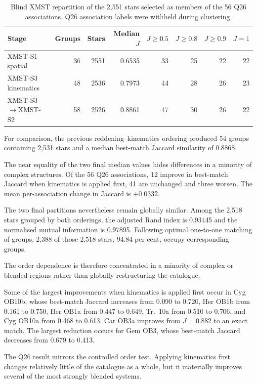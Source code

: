 \documentclass[fleqn,usenatbib]{rasti}
\begin{document}
\begin{table}
\centering
\caption{Blind XMST repartition of the 2,551 stars selected as members
of the 56 Q26 associations. Q26 association labels were withheld during
clustering.}
\label{tab:q26_order}
\begin{tabular}{lrrrrrrr}
\hline
Stage & Groups & Stars & Median $J$ &
$J\geq0.5$ & $J\geq0.8$ & $J\geq0.9$ & $J=1$ \\
\hline
XMST-S1 spatial
& 36 & 2551 & 0.6535 & 33 & 25 & 22 & 22 \\
XMST-S3 kinematics
& 48 & 2536 & 0.7973 & 44 & 28 & 26 & 23 \\
XMST-S3$\rightarrow$XMST-S2
& 58 & 2526 & 0.8861 & 47 & 30 & 26 & 22 \\
\hline
\end{tabular}
\end{table}

For comparison, the previous reddening--kinematics ordering produced
54 groups containing 2,531 stars and a median best-match Jaccard similarity
of 0.8868.

The near equality of the two final median values hides differences in a
minority of complex structures. Of the 56 Q26 associations, 12 improve in
best-match Jaccard when kinematics is applied first, 41 are unchanged and
three worsen. The mean per-association change in Jaccard is $+0.0332$.

The two final partitions nevertheless remain globally similar. Among the
2,518 stars grouped by both orderings, the adjusted Rand index is 0.93445
and the normalised mutual information is 0.97895. Following optimal
one-to-one matching of groups, 2,388 of those 2,518 stars, 94.84 per cent,
occupy corresponding groups.

The order dependence is therefore concentrated in a minority of complex or
blended regions rather than globally restructuring the catalogue.

Some of the largest improvements when kinematics is applied first occur in
Cyg OB10b, whose best-match Jaccard increases from 0.090 to 0.720,
Her OB1b from 0.161 to 0.750, Her OB1a from 0.447 to 0.649,
Tr.~10a from 0.510 to 0.706, and Cyg OB10a from 0.468 to 0.613.
Car OB3a improves from $J=0.882$ to an exact match. The largest reduction
occurs for Gem OB3, whose best-match Jaccard decreases from 0.679 to 0.413.

The Q26 result mirrors the controlled order test. Applying kinematics first changes relatively little of the catalogue as a whole, but it materially improves several of the most strongly blended systems.
\end{document}
